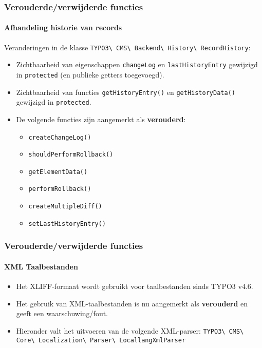 
\begin{frame}[fragile]
	\frametitle{Verouderde/verwijderde functies}
	\framesubtitle{Afhandeling historie van records}

	Veranderingen in de klasse
		\smaller
			\texttt{TYPO3\textbackslash
				CMS\textbackslash
				Backend\textbackslash
				History\textbackslash
				RecordHistory}:
		\normalsize

	\begin{itemize}

		\item Zichtbaarheid van eigenschappen \texttt{changeLog} en \texttt{lastHistoryEntry}
			gewijzigd in \texttt{protected} (en publieke getters toegevoegd).
		\item Zichtbaarheid van functies \texttt{getHistoryEntry()} en \texttt{getHistoryData()}
			gewijzigd in \texttt{protected}.
		\item De volgende functies zijn aangemerkt als \textbf{verouderd}:

			\begin{itemize}\smaller
				\item \texttt{createChangeLog()}
				\item \texttt{shouldPerformRollback()}
				\item \texttt{getElementData()}
				\item \texttt{performRollback()}
				\item \texttt{createMultipleDiff()}
				\item \texttt{setLastHistoryEntry()}
			\end{itemize}\normalsize

	\end{itemize}

\end{frame}


\begin{frame}[fragile]
	\frametitle{Verouderde/verwijderde functies}
	\framesubtitle{XML Taalbestanden}

	\begin{itemize}
		\item Het XLIFF-formaat wordt gebruikt voor taalbestanden sinds TYPO3 v4.6.
		\item Het gebruik van XML-taalbestanden is nu aangemerkt als \textbf{verouderd}
			en geeft een waarschuwing/fout.
		\item Hieronder valt het uitvoeren van de volgende XML-parser:\newline
			\small
				\texttt{TYPO3\textbackslash
					CMS\textbackslash
					Core\textbackslash
					Localization\textbackslash
					Parser\textbackslash
					LocallangXmlParser}
			\normalsize
	\end{itemize}

\end{frame}

